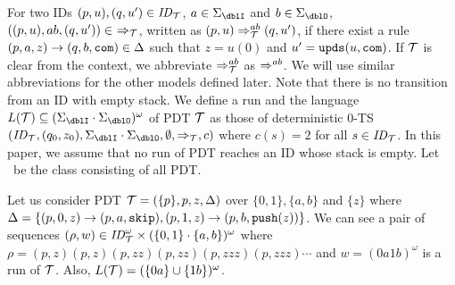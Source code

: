 For two IDs $(p, u), (q, u')\in \mathit{ID}_{\cal T}$,
$a\in\Sigma_\dblI$ and $b\in\Sigma_\dblO$,
$((p, u), ab, (q, u'))\in\ \Rightarrow_\calT$,
written as $(p, u) \Rightarrow_{{\cal T}}^{ab} (q, u')$,
if there exist a rule $(p, a, z) \rightarrow (q, b, \mathtt{com}) \in \Delta$
such that $z=u(0)$ and $u'=\mathtt{upds}(u,\mathtt{com})$.
If ${\cal T}$ is clear from the context,
we abbreviate
$\Rightarrow_{{\cal T}}^{ab}$ as $\Rightarrow^{ab}$.
We will use similar abbreviations for the other models defined later.
Note that there is no transition from an ID with empty stack.
We define a run and the language $L(\calT)\subseteq (\Sigma_\dblI \cdot \Sigma_\dblO)^{\omega}$ of PDT ${\cal T}$ as those of
deterministic $0$-TS $(\ID_\calT, (q_0,z_0), \Sigma_\dblI\cdot\Sigma_\dblO, \emptyset, \Rightarrow_\calT, c)$ where $c(s)=2$ for all $s\in\mathit{ID}_{\cal T}$.
In this paper,
we assume that no run of PDT reaches an ID whose stack is empty.
Let \PDT\ be the class consisting of all PDT.

\begin{example}
\label{ex: PDT}
Let us consider PDT
${\cal T} = (\{p\},p,z,\Delta)$
over $\{0,1\},\{a,b\}$ and $\{z\}$ where
$\Delta = \{
(p, 0, z) \rightarrow (p, a, \mathtt{skip}),
(p, 1, z) \rightarrow (p, b, \mathtt{push}(z))
\}$.
We can see
a pair of sequences $(\rho,w)\in \mathit{ID}_{\cal T}^\omega\times (\{0,1\}\cdot\{a,b\})^\omega$ where
$\rho=(p,z)(p,z)(p,zz)(p,zz)(p,zzz)(p,zzz)\cdots$
and $w=(0a1b)^\omega$
is a run of ${\cal T}$.
Also, $L({\cal T})=(\{0a\}\cup\{1b\})^\omega$.
\end{example}

